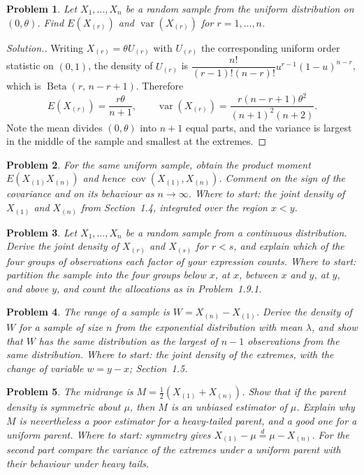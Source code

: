 \documentclass[12pt,a4paper]{report}
\theoremstyle{definition}
\theoremstyle{plain}
\newtheorem{problemx}{Problem}[section]
\newenvironment{problem}{\begin{problemx}}{\end{problemx}}
\newenvironment{solution}
  {\renewcommand{\qedsymbol}{}\begin{proof}[\textit{Solution}.]}
  {\end{proof}}
\begin{document}
\begin{problem}
Let $X_1,\dots,X_n$ be a random sample from the uniform distribution on
$(0,\theta)$. Find $E\left(X_{(r)}\right)$ and
$\operatorname{var}\left(X_{(r)}\right)$ for $r=1,\dots,n$.
\end{problem}

\begin{solution}
Writing $X_{(r)} = \theta U_{(r)}$ with $U_{(r)}$ the corresponding uniform
order statistic on $(0,1)$, the density of $U_{(r)}$ is
$\dfrac{n!}{(r-1)!(n-r)!}u^{r-1}(1-u)^{n-r}$, which is
$\operatorname{Beta}(r,\,n-r+1)$. Therefore
$$E\left(X_{(r)}\right) = \frac{r\theta}{n+1},\qquad
\operatorname{var}\left(X_{(r)}\right)
= \frac{r(n-r+1)\theta^{2}}{(n+1)^{2}(n+2)} .$$
Note the mean divides $(0,\theta)$ into $n+1$ equal parts, and the variance is
largest in the middle of the sample and smallest at the extremes.
\end{solution}

\begin{problem}
For the same uniform sample, obtain the product moment
$E\left(X_{(1)}X_{(n)}\right)$ and hence
$\operatorname{cov}\left(X_{(1)},X_{(n)}\right)$. Comment on the sign of the
covariance and on its behaviour as $n\to\infty$.
\emph{Where to start: the joint density of $X_{(1)}$ and $X_{(n)}$ from Section~1.4, integrated over the region $x<y$.}
\end{problem}

\begin{problem}
Let $X_1,\dots,X_n$ be a random sample from a continuous distribution.
Derive the joint density of $X_{(r)}$ and $X_{(s)}$ for $r<s$, and explain
which of the four groups of observations each factor of your expression counts.
\emph{Where to start: partition the sample into the four groups below $x$, at $x$, between $x$ and $y$, at $y$, and above $y$, and count the allocations as in Problem~1.9.1.}
\end{problem}

\begin{problem}
The \emph{range} of a sample is $W = X_{(n)}-X_{(1)}$. Derive the density of $W$
for a sample of size $n$ from the exponential distribution with mean $\lambda$,
and show that $W$ has the same distribution as the largest of $n-1$
observations from the same distribution.
\emph{Where to start: the joint density of the extremes, with the change of variable $w = y-x$; Section~1.5.}
\end{problem}

\begin{problem}
The \emph{midrange} is $M = \tfrac12\left(X_{(1)}+X_{(n)}\right)$. Show that if
the parent density is symmetric about $\mu$, then $M$ is an unbiased estimator
of $\mu$. Explain why $M$ is nevertheless a poor estimator for a heavy-tailed
parent, and a good one for a uniform parent.
\emph{Where to start: symmetry gives $X_{(1)}-\mu \overset{d}{=} \mu-X_{(n)}$. For the second part compare the variance of the extremes under a uniform parent with their behaviour under heavy tails.}
\end{problem}
\end{document}
